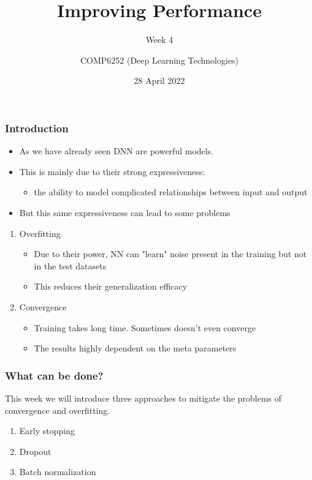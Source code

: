 \documentclass{beamer}
\begin{document}
\title{Improving Performance}
\subtitle{Week 4}
\author{COMP6252 (Deep Learning Technologies)}
 \date{28 April 2022}

\begin{frame}
    \placelogofalse %
    \titlepage
\end{frame}
    
\placelogotrue

    
\renewcommand{\figurename}{From}
\begin{frame}
    \frametitle{Introduction}
\begin{itemize}
    \item As we have already  seen DNN are powerful models.
    \item This is mainly due to their strong expressiveness: 
    \begin{itemize}
        \item  the ability to model complicated relationships between input and output
    \end{itemize}
   
    \item But this same expressiveness can lead to some problems
\end{itemize}
    \begin{enumerate}
        \item Overfitting
        \begin{itemize}
            \item Due to their power, NN can "learn" noise present in the training but not in the test datasets 
            \item This reduces their generalization efficacy
        \end{itemize}
        \item Convergence 
        \begin{itemize}
            \item Training takes long time. Sometimes doesn't even converge
            \item The results highly dependent on the meta parameters 
        \end{itemize}
    \end{enumerate}

\end{frame}
\begin{frame}
    \frametitle{What can be done?}
    This week we will introduce three approaches to mitigate the problems of convergence and overfitting.

    \begin{enumerate}
        \item Early stopping
        \item Dropout
        \item Batch normalization 
    \end{enumerate}
\end{frame}
\end{document}
